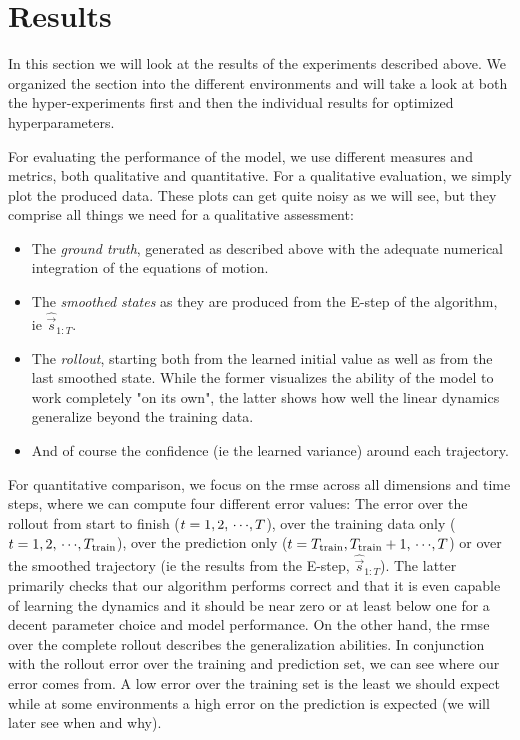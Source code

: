 \section{Results}
	\label{sec:results}

	In this section we will look at the results of the experiments described above. We organized the section into the different environments and will take a look at both the hyper-experiments first and then the individual results for optimized hyperparameters.

	For evaluating the performance of the model, we use different measures and metrics, both qualitative and quantitative. For a qualitative evaluation, we simply plot the produced data. These plots can get quite noisy as we will see, but they comprise all things we need for a qualitative assessment:
	\begin{itemize}
		\item The \emph{ground truth}, generated as described above with the adequate numerical integration of the equations of motion.
		\item The \emph{smoothed states} as they are produced from the E-step of the \algname algorithm, \ac{ie} \(\hat{\vec{s}}_{1:T}\).
		\item The \emph{rollout}, starting both from the learned initial value as well as from the last smoothed state. While the former visualizes the ability of the model to work completely "on its own", the latter shows how well the linear dynamics generalize beyond the training data.
		\item And of course the confidence (\ac{ie} the learned variance) around each trajectory.
	\end{itemize}
	For quantitative comparison, we focus on the \ac{rmse} across all dimensions and time steps, where we can compute four different error values: The error over the rollout from start to finish (\( t = 1, 2, \,\cdots\!, T \)), over the training data only (\( t = 1, 2, \,\cdots\!, T_{\mathrm{train}} \)), over the prediction only (\( t = T_{\mathrm{train}}, T_{\mathrm{train}} + 1, \,\cdots\!, T \)) or over the smoothed trajectory (\ac{ie} the results from the E-step, \(  \hat{\vec{s}}_{1:T} \)). The latter primarily checks that our algorithm performs correct and that it is even capable of learning the dynamics and it should be near zero or at least below one for a decent parameter choice and model performance. On the other hand, the \ac{rmse} over the complete rollout describes the generalization abilities. In conjunction with the rollout error over the training and prediction set, we can see where our error comes from. A low error over the training set is the least we should expect while at some environments a high error on the prediction is expected (we will later see when and why).

